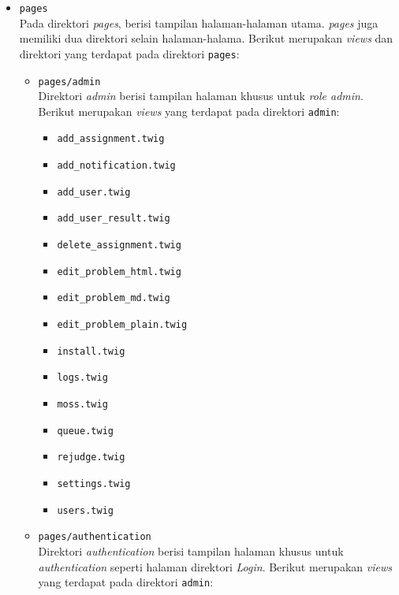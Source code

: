 \documentclass[a4paper,twoside]{article}
\begin{document}
\begin{enumerate}
\begin{itemize}
\begin{itemize}
			            \item \verb|pages| \\
			                  Pada direktori \textit{pages}, berisi tampilan halaman-halaman utama. \textit{pages} juga memiliki dua direktori selain halaman-halama. Berikut merupakan \textit{views} dan direktori yang terdapat pada direktori \verb|pages|:

			                  \begin{itemize}
				                  \item \verb|pages/admin| \\
				                        Direktori \textit{admin} berisi tampilan halaman khusus untuk \textit{role admin}. Berikut merupakan \textit{views} yang terdapat pada direktori \verb|admin|:

				                        \begin{itemize}
					                        \item \verb|add_assignment.twig|
					                        \item \verb|add_notification.twig|
					                        \item \verb|add_user.twig|
					                        \item \verb|add_user_result.twig|
					                        \item \verb|delete_assignment.twig|
					                        \item \verb|edit_problem_html.twig|
					                        \item \verb|edit_problem_md.twig|
					                        \item \verb|edit_problem_plain.twig|
					                        \item \verb|install.twig|
					                        \item \verb|logs.twig|
					                        \item \verb|moss.twig|
					                        \item \verb|queue.twig|
					                        \item \verb|rejudge.twig|
					                        \item \verb|settings.twig|
					                        \item \verb|users.twig|
				                        \end{itemize}

				                        \vspace{0.25cm}
				                  \item \verb|pages/authentication| \\
				                        Direktori \textit{authentication} berisi tampilan halaman khusus untuk \textit{authentication} seperti halaman direktori \textit{Login}. Berikut merupakan \textit{views} yang terdapat pada direktori \verb|admin|:


\end{itemize}
\end{itemize}
\end{itemize}
\end{enumerate}
\end{document}
